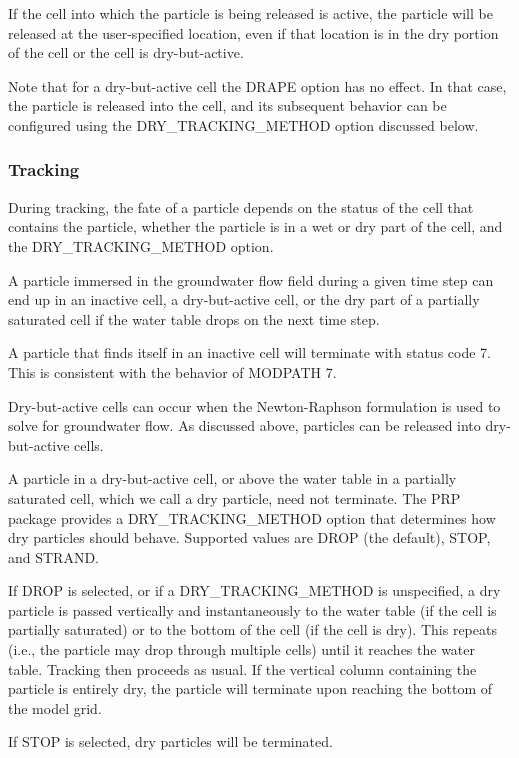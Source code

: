 If the cell into which the particle is being released is active, the particle will be released at the user-specified location, even if that location is in the dry portion of the cell or the cell is dry-but-active.

Note that for a dry-but-active cell the DRAPE option has no effect. In that case, the particle is released into the cell, and its subsequent behavior can be configured using the DRY\_TRACKING\_METHOD option discussed below.

\subsubsection{Tracking}

During tracking, the fate of a particle depends on the status of the cell that contains the particle, whether the particle is in a wet or dry part of the cell, and the DRY\_TRACKING\_METHOD option.

A particle immersed in the groundwater flow field during a given time step can end up in an inactive cell, a dry-but-active cell, or the dry part of a partially saturated cell if the water table drops on the next time step.

A particle that finds itself in an inactive cell will terminate with status code 7. This is consistent with the behavior of MODPATH 7.

Dry-but-active cells can occur when the Newton-Raphson formulation is used to solve for groundwater flow. As discussed above, particles can be released into dry-but-active cells.

A particle in a dry-but-active cell, or above the water table in a partially saturated cell, which we call a dry particle, need not terminate. The PRP package provides a DRY\_TRACKING\_METHOD option that determines how dry particles should behave. Supported values are DROP (the default), STOP, and STRAND.

If DROP is selected, or if a DRY\_TRACKING\_METHOD is unspecified, a dry particle is passed vertically and instantaneously to the water table (if the cell is partially saturated) or to the bottom of the cell (if the cell is dry). This repeats (i.e., the particle may drop through multiple cells) until it reaches the water table. Tracking then proceeds as usual. If the vertical column containing the particle is entirely dry, the particle will terminate upon reaching the bottom
of the model grid.

If STOP is selected, dry particles will be terminated.


